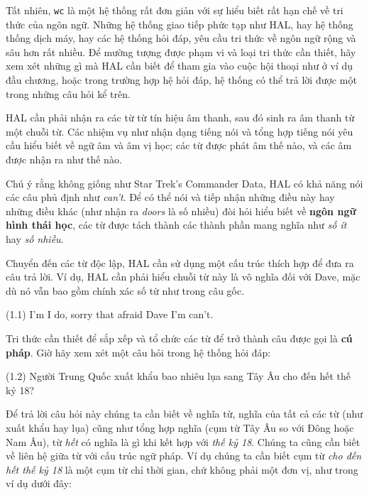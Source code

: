 Tất nhiên, \verb|wc| là một hệ thống rất đơn giản với sự hiểu biết rất hạn chế về tri thức của ngôn ngữ. Những hệ thống giao tiếp phức tạp như HAL, hay hệ thống thống dịch máy, hay các hệ thống hỏi đáp, yêu cầu tri thức về ngôn ngữ rộng và sâu hơn rất nhiều. Để mường tượng được phạm vi và loại tri thức cần thiết, hãy xem xét những gì mà HAL cần biết để tham gia vào cuộc hội thoại như ở ví dụ đầu chương, hoặc trong trường hợp hệ hỏi đáp, hệ thống có thể trả lời được một trong những câu hỏi kể trên.

HAL cần phải nhận ra các từ từ tín hiệu âm thanh, sau đó sinh ra âm thanh từ một chuỗi từ. Các nhiệm vụ như nhận dạng tiếng nói và tổng hợp tiếng nói yêu cầu hiểu biết về ngữ âm và âm vị học; các từ được phát âm thế nào, và các âm được nhận ra như thế nào.

Chú ý rằng không giống như Star Trek's Commander Data, HAL có khả năng nói các câu phủ định như \textit{can't}. Để có thể nói và tiếp nhận những điều này hay những điều khác (như nhận ra \textit{doors} là số nhiều) đòi hỏi hiểu biết về \textbf{ngôn ngữ hình thái học}, các từ được tách thành các thành phần mang nghĩa như \textit{số ít} hay \textit{số nhiều}.

Chuyển đến các từ độc lập, HAL cần sử dụng một cấu trúc thích hợp để đưa ra câu trả lời. Ví dụ, HAL cần phải hiểu chuỗi từ này là vô nghĩa đối với Dave, mặc dù nó vẫn bao gồm chính xác số từ như trong câu gốc.

\vspace{2mm}
\noindent
(1.1) I’m I do, sorry that afraid Dave I’m can’t.
\vspace{2mm}

Tri thức cần thiết để sắp xếp và tổ chức các từ để trở thành câu được gọi là \textbf{cú pháp}. Giờ hãy xem xét một câu hỏi trong hệ thống hỏi đáp:

\vspace{2mm}
\noindent
(1.2) Người Trung Quốc xuất khẩu bao nhiêu lụa sang Tây Âu cho đến hết thế kỷ 18?
\vspace{2mm}

Để trả lời câu hỏi này chúng ta cần biết về nghĩa từ, nghĩa của tất cả các từ (như xuất khẩu hay lụa) cũng như tổng hợp nghĩa (cụm từ Tây Âu so với Đông hoặc Nam Âu), từ \textit{hết} có nghĩa là gì khi kết hợp với \textit{thế kỷ 18}. Chúng ta cũng cần biết về liên hệ giữa từ với cấu trúc ngữ pháp. Ví dụ chúng ta cần biết cụm từ \textit{cho đến hết thế kỷ 18} là một cụm từ chỉ thời gian, chứ không phải một đơn vị, như trong ví dụ dưới đây:

